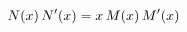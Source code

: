 $\mathop{N\/}\nolimits\!\left(x\right)\mathop{N\/}\nolimits'\!\left(x\right)=x%
\mathop{M\/}\nolimits\!\left(x\right)\mathop{M\/}\nolimits'\!\left(x\right)$